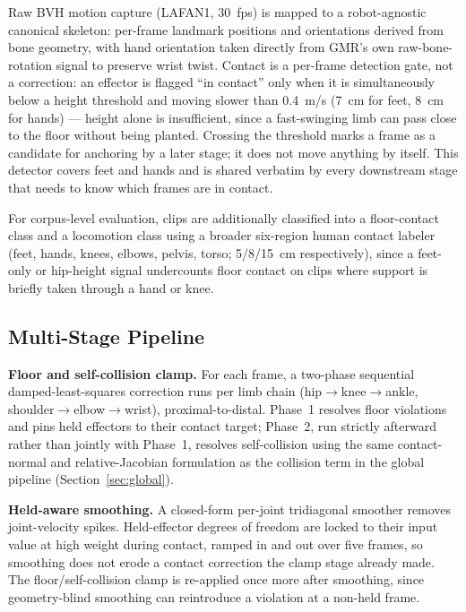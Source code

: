 Raw BVH motion capture (LAFAN1, 30~fps) is mapped to a robot-agnostic
canonical skeleton: per-frame landmark positions and orientations derived
from bone geometry, with hand orientation taken directly from GMR's own
raw-bone-rotation signal to preserve wrist twist. Contact is a per-frame
detection gate, not a correction: an effector is flagged ``in contact'' only
when it is simultaneously below a height threshold and moving slower than
0.4~m/s (7~cm for feet, 8~cm for hands) --- height alone is insufficient,
since a fast-swinging limb can pass close to the floor without being
planted. Crossing the threshold marks a frame as a candidate for anchoring
by a later stage; it does not move anything by itself. This detector covers
feet and hands and is shared verbatim by every downstream stage that needs
to know which frames are in contact.

For corpus-level evaluation, clips are additionally classified into a
floor-contact class and a locomotion class using a broader six-region human
contact labeler (feet, hands, knees, elbows, pelvis, torso; 5/8/15~cm
respectively), since a feet-only or hip-height signal undercounts floor
contact on clips where support is briefly taken through a hand or knee.

\subsection{Multi-Stage Pipeline}
\label{sec:multistage}

\noindent\textbf{Floor and self-collision clamp.} For each frame, a
two-phase sequential damped-least-squares correction runs per limb chain
(hip$\to$knee$\to$ankle, shoulder$\to$elbow$\to$wrist), proximal-to-distal.
Phase~1 resolves floor violations and pins held effectors to their contact
target; Phase~2, run strictly afterward rather than jointly with Phase~1,
resolves self-collision using the same contact-normal and
relative-Jacobian formulation as the collision term in the global pipeline
(Section~\ref{sec:global}).

\noindent\textbf{Held-aware smoothing.} A closed-form per-joint tridiagonal
smoother removes joint-velocity spikes. Held-effector degrees of freedom are
locked to their input value at high weight during contact, ramped in and
out over five frames, so smoothing does not erode a contact correction the
clamp stage already made. The floor/self-collision clamp is re-applied once
more after smoothing, since geometry-blind smoothing can reintroduce a
violation at a non-held frame.


